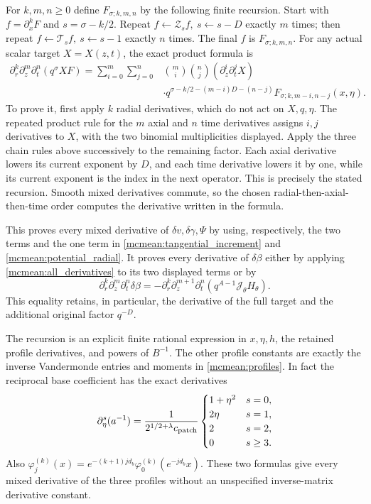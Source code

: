 \documentclass[11pt]{article}
\begin{document}
For \(k,m,n\ge0\) define \(F_{\sigma;k,m,n}\) by the following
finite recursion. Start with \(f=\partial_x^kF\) and
\(s=\sigma-k/2\). Repeat
\(f\leftarrow\mathcal Z_s f,\ s\leftarrow s-D\) exactly \(m\)
times; then repeat \(f\leftarrow\mathcal T_s f,\ s\leftarrow s-1\)
exactly \(n\) times. The final \(f\) is \(F_{\sigma;k,m,n}\).
For any actual scalar target \(X=X(z,t)\), the exact product formula is
\begin{equation}\label{mcmean:all_derivatives}
\begin{split}
 \partial_r^k\partial_z^m\partial_t^n(q^\sigma XF)
  =\sum_{i=0}^m\sum_{j=0}^n&\binom mi\binom nj
     (\partial_z^i\partial_t^jX)\\
  &\cdot q^{\sigma-k/2-(m-i)D-(n-j)}
       F_{\sigma;k,m-i,n-j}(x,\eta).
\end{split}
\end{equation}
To prove it, first apply \(k\) radial derivatives, which do not act
on \(X,q,\eta\). The repeated product rule for the \(m\) axial and
\(n\) time derivatives assigns \(i,j\) derivatives to \(X\), with
the two binomial multiplicities displayed. Apply the three chain
rules above successively to the remaining factor. Each axial
derivative lowers its current exponent by \(D\), and each time
derivative lowers it by one, while its current exponent is the index
in the next operator. This is precisely the stated recursion.
Smooth mixed derivatives commute, so the chosen radial-then-axial-
then-time order computes the derivative written in the formula.

This proves every mixed derivative of \(\delta v,\delta\gamma,\Psi\)
by using, respectively, the two terms and the one term in
\eqref{mcmean:tangential_increment} and \eqref{mcmean:potential_radial}.
It proves every derivative of \(\delta\beta\) either by applying
\eqref{mcmean:all_derivatives} to its two displayed terms or by
\begin{equation}\label{mcmean:radial_all_derivatives}
 \partial_r^k\partial_z^m\partial_t^n\delta\beta
 =-\partial_r^k\partial_z^{m+1}\partial_t^n
          (q^{A-1}\mathcal J_\theta H_\theta).
\end{equation}
This equality retains, in particular, the derivative of the full
target and the additional original factor \(q^{-D}\).

The recursion is an explicit finite rational expression in
\(x,\eta,h\), the retained profile derivatives, and powers of
\(B^{-1}\). The other profile constants are exactly the inverse
Vandermonde entries and moments in \eqref{mcmean:profiles}.
In fact the reciprocal base coefficient has the exact derivatives
\begin{equation}\label{mcmean:reciprocal_a}
 \partial_\eta^s(a^{-1})=
 \frac{1}{2^{1/2+\lambda}c_{\rm patch}}
 \begin{cases}1+\eta^2&s=0,\\2\eta&s=1,\\2&s=2,\\0&s\ge3.
 \end{cases}
\end{equation}
Also \(\varphi_j^{(k)}(x)=e^{-(k+1)jd_b}
\varphi_0^{(k)}(e^{-jd_b}x)\).
These two formulas give every mixed derivative of the three profiles
without an unspecified inverse-matrix derivative constant.
\end{document}

